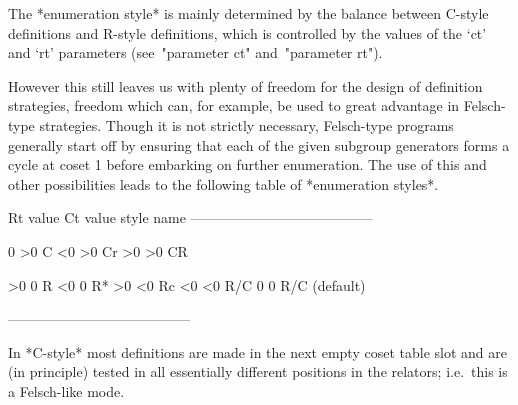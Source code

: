 \endlist

The *enumeration  style* is mainly  determined by the  balance between
C-style definitions  and R-style  definitions, which is  controlled by
the  values  of  the  `ct'  and `rt'  parameters  (see~"parameter  ct"
and~"parameter rt").

However this still leaves us with  plenty of freedom for the design of
definition  strategies,  freedom which  can, for example,  be  used to
great advantage in Felsch-type strategies. Though it is  not  strictly
necessary, Felsch-type  programs generally start off  by ensuring that
each of the given subgroup generators  forms a cycle at coset 1 before
embarking  on   further  enumeration.  The  use  of   this  and  other
possibilities leads to the following table of *enumeration styles*.


\begintt
Rt value     Ct value     style name
---------------------------------------

   0           >0         C
  <0           >0         Cr
  >0           >0         CR

  >0            0         R
  <0            0         R*
  >0           <0         Rc
  <0           <0         R/C
   0            0         R/C (default)

---------------------------------------
\endtt

In *C-style*  most definitions are made in the  next empty coset table
slot  and  are (in  principle)  tested  in  all essentially  different
positions in the relators; i.e.~this is a Felsch-like mode.

